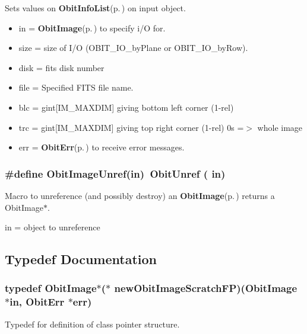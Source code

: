 Sets values on {\bf Obit\-Info\-List}{\rm (p.\,\pageref{structObitInfoList})} on input object. \begin{itemize}
\item in = {\bf Obit\-Image}{\rm (p.\,\pageref{structObitImage})} to specify i/O for. \item size = size of I/O (OBIT\_\-IO\_\-by\-Plane or OBIT\_\-IO\_\-by\-Row). \item disk = fits disk number \item file = Specified FITS file name. \item blc = gint[IM\_\-MAXDIM] giving bottom left corner (1-rel) \item trc = gint[IM\_\-MAXDIM] giving top right corner (1-rel) 0s =$>$ whole image \item err = {\bf Obit\-Err}{\rm (p.\,\pageref{structObitErr})} to receive error messages. \end{itemize}
\subsubsection{\setlength{\rightskip}{0pt plus 5cm}\#define Obit\-Image\-Unref(in)\ Obit\-Unref ( in)}\label{ObitImage_8h_a0}


Macro to unreference (and possibly destroy) an {\bf Obit\-Image}{\rm (p.\,\pageref{structObitImage})} returns a Obit\-Image$\ast$. 

in = object to unreference 

\subsection{Typedef Documentation}
\subsubsection{\setlength{\rightskip}{0pt plus 5cm}typedef {\bf Obit\-Image}$\ast$($\ast$ {\bf new\-Obit\-Image\-Scratch\-FP})({\bf Obit\-Image} $\ast$in, {\bf Obit\-Err} $\ast$err)}\label{ObitImage_8h_a6}


Typedef for definition of class pointer structure. 

